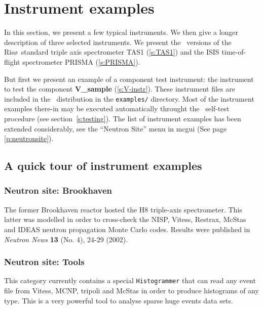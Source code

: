 
\chapter{Instrument examples}
\label{s:instrument}

In this section, we present a few typical instruments.  We then give a longer
description of three selected instruments. We present the \MCS\ versions of the
Ris\o\ standard triple axis spectrometer TAS1 (\ref{s:TAS1}) and the ISIS
time-of-flight spectrometer PRISMA (\ref{s:PRISMA}).

But first we present an example of a component test instrument: the instrument
to test the component {\bf V\_sample} (\ref{s:V-instr}).
%
These instrument files are included in the \MCS\ distribution in the
\verb+examples/+ directory.  Most of the instrument examples there-in may be
executed automatically throught the \MCS\ self-test procedure (see
section~\ref{s:testing}).  The list of instrument examples has been extended
considerably, see the ``Neutron Site'' menu in mcgui (See page
\ref{p:neutronsite}).

\section{A quick tour of instrument examples}
\label{s:quick-tour-instr}

\subsection{Neutron site: Brookhaven}

The former Brookhaven reactor hosted the H8 triple-axis spectrometer. This latter was modelled in order to cross-check the NISP, Vitess, Restrax, McStas and IDEAS neutron propagation Monte Carlo codes. Results were published in {\it Neutron News} {\bf 13} (No. 4), 24-29 (2002).

\subsection{Neutron site: Tools}

This category currently contains a special \verb+Histogrammer+ that can read any event file from Vitess, MCNP, tripoli and McStas in order to produce histograms of any type. This is a very powerful tool to analyse sparse huge events data sets.

